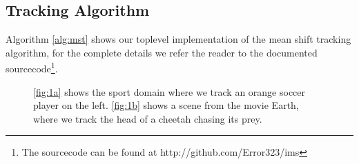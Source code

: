 \documentclass[11pt]{article}
\begin{document}
\subsection{Tracking Algorithm} \label{sec:mst}
Algorithm \ref{alg:mst} shows our toplevel implementation of the mean shift
tracking algorithm, for the complete details we refer the reader to the
documented sourcecode\footnote{The sourcecode can be found at
http://github.com/Error323/ims}.

\begin{figure}
\centering
{}
\caption{\ref{fig:1a} shows the sport domain where we track an orange soccer
player on the left. \ref{fig:1b} shows a scene from the movie Earth, where we
track the head of a cheetah chasing its prey.}
\label{fig:videos}
\end{figure}
\end{document}
